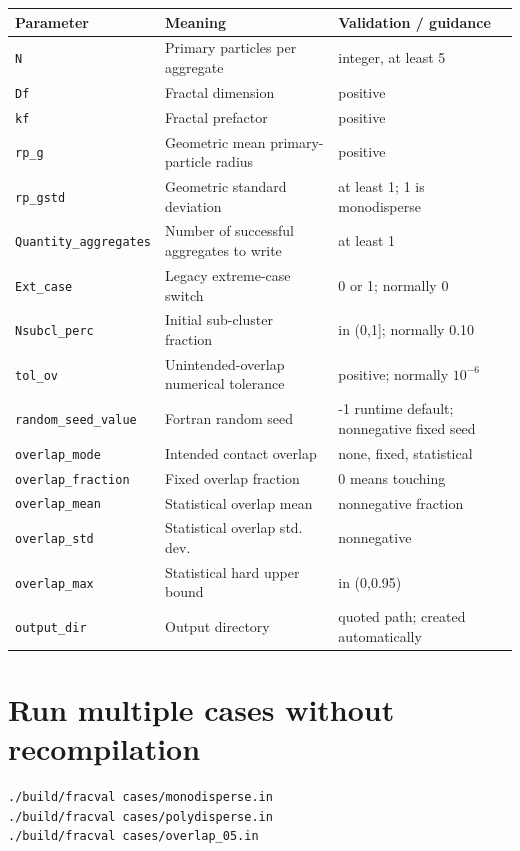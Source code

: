 \documentclass[11pt,oneside]{report}
\newcommand{\code}[1]{\texttt{#1}}
\begin{document}
\begin{longtable}{p{}p{}p{}}
\toprule
Parameter & Meaning & Validation / guidance \\
\midrule
\endhead
\code{N} & Primary particles per aggregate & integer, at least 5 \\
\code{Df} & Fractal dimension & positive \\
\code{kf} & Fractal prefactor & positive \\
\code{rp\_g} & Geometric mean primary-particle radius & positive \\
\code{rp\_gstd} & Geometric standard deviation & at least 1; 1 is monodisperse \\
\code{Quantity\_aggregates} & Number of successful aggregates to write & at least 1 \\
\code{Ext\_case} & Legacy extreme-case switch & 0 or 1; normally 0 \\
\code{Nsubcl\_perc} & Initial sub-cluster fraction & in (0,1]; normally 0.10 \\
\code{tol\_ov} & Unintended-overlap numerical tolerance & positive; normally \(10^{-6}\) \\
\code{random\_seed\_value} & Fortran random seed & -1 runtime default; nonnegative fixed seed \\
\code{overlap\_mode} & Intended contact overlap & none, fixed, statistical \\
\code{overlap\_fraction} & Fixed overlap fraction & 0 means touching \\
\code{overlap\_mean} & Statistical overlap mean & nonnegative fraction \\
\code{overlap\_std} & Statistical overlap std. dev. & nonnegative \\
\code{overlap\_max} & Statistical hard upper bound & in (0,0.95) \\
\code{output\_dir} & Output directory & quoted path; created automatically \\
\bottomrule
\end{longtable}

\section{Run multiple cases without recompilation}

\begin{lstlisting}[language=bash]
./build/fracval cases/monodisperse.in
./build/fracval cases/polydisperse.in
./build/fracval cases/overlap_05.in
\end{lstlisting}
\end{document}
